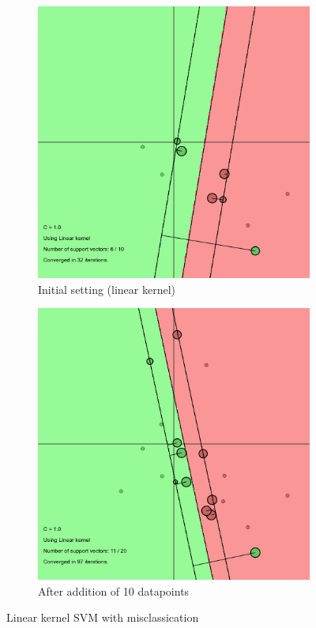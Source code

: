 \documentclass[11pt, a4paper]{article}
\begin{document}
\begin{figure}[H]
  \vspace{20pt}
    \centering
    \begin{subfigure}{.5\textwidth}
      \centering
      \includegraphics[width=0.9\linewidth]{1-2-1-linear.png}
      \caption{Initial setting (linear kernel)}
      \label{fig:lin1}
    \end{subfigure}%
    \begin{subfigure}{.5\textwidth}
      \centering
      \includegraphics[width=0.9\linewidth]{1-2-1-linear_10.png}
      \caption{After addition of 10 datapoints}
      \label{fig:lin2}
    \end{subfigure}
    \caption{Linear kernel SVM with misclassication}
    \label{fig:bull}
\end{figure}
\end{document}
